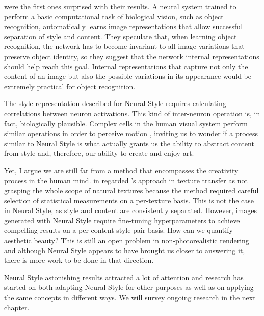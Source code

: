 \citeauthor{Gatys2015B} were the first ones surprised with their results.
A neural system trained to perform a basic computational task of biological vision, such as object recognition, automatically learns image representations that allow successful separation of style and content.
They speculate that, when learning object recognition, the network has to become invariant to all image variations that preserve object identity, so they suggest that the network internal representations should help reach this goal.
Internal representations that capture not only the content of an image but also the possible variations in its appearance would be extremely practical for object recognition.

The style representation described for Neural Style requires calculating correlations between neuron activations.
This kind of inter-neuron operation is, in fact, biologically plausible.
Complex cells in the human visual system perform similar operations in order to perceive motion \cite{Adelson1985}, inviting us to wonder if a process similar to Neural Style is what actually grants us the ability to abstract content from style and, therefore, our ability to create and enjoy art.

Yet, I argue we are still far from a method that encompasses the creativity process in the human mind.
\citeauthor{Gatys2015A} in \cite{Gatys2015A} regarded \citet{Portilla2000}'s approach in texture transfer as not grasping the whole scope of natural textures because the method required careful selection of statistical measurements on a per-texture basis.
This is not the case in Neural Style, as style and content are consistently separated.
However, images generated with Neural Style require fine-tuning hyperparameters to achieve compelling results on a per content-style pair basis.
How can we quantify aesthetic beauty? This is still an open problem in non-photorealistic rendering \cite{Kyprianidis2013} and although Neural Style appears to have brought us closer to answering it, there is more work to be done in that direction.

Neural Style astonishing results attracted a lot of attention and research has started on both adapting Neural Style for other purposes as well as on applying the same concepts in different ways.
We will survey ongoing research in the next chapter.
